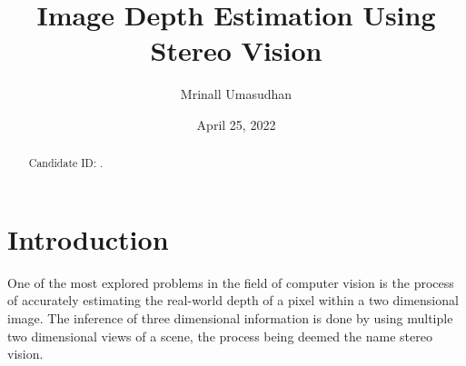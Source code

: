 \documentclass[11pt]{scrartcl}
\begin{document}
\title{Image Depth Estimation Using Stereo Vision}
\author{Mrinall Umasudhan}
\date{April 25, 2022}
\maketitle
{}

\begin{abstract}
	Candidate ID: .
\end{abstract}

\tableofcontents


\newpage

\section{Introduction}
One of the most explored problems in the field of computer vision is the process
of accurately estimating the real-world depth of a pixel within a two dimensional
image. The inference of three dimensional information is done by using multiple two
dimensional views of a scene, the process being deemed the name stereo vision. 
\end{document}
